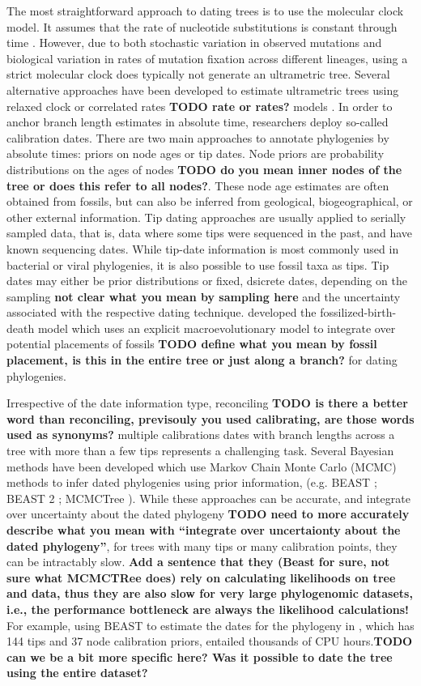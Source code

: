 \documentclass{llncs}
\begin{document}
The most straightforward approach to dating trees is to use the molecular clock model.
It assumes that the rate of nucleotide substitutions is constant through time \citep{zuckerkandl1962}.
However, due to both stochastic variation in observed mutations and 
biological variation in rates of mutation fixation across different lineages,
using a strict molecular clock does typically not generate an ultrametric tree.
Several alternative approaches have been developed to estimate
ultrametric trees using relaxed clock or correlated rates {\bf TODO rate or rates?} models \citep{Lepage2007, Thorne1998, Kishino2001}.
In order to anchor branch length estimates in absolute time, researchers deploy so-called calibration dates. 
There are two main approaches to annotate phylogenies by absolute times:
priors on node ages or tip dates.
Node priors are probability distributions on the ages of nodes {\bf TODO do you mean inner nodes of the tree or does this refer to all nodes?}.
These node age estimates are often obtained from fossils,
but can also be inferred from geological, biogeographical, or other external information.
Tip dating approaches are usually applied to serially sampled data, that is, 
data where some tips were sequenced in the past, and have known sequencing dates.
While tip-date information is most commonly used in bacterial or viral phylogenies,
it is also possible to use fossil taxa as tips.
Tip dates may either be prior distributions or fixed, dsicrete dates, 
depending on the sampling {\bf not clear what you mean by sampling here} and the uncertainty associated with the respective
dating technique.
\citet{Heath2014} developed the fossilized-birth-death model which 
uses an explicit macroevolutionary model to integrate over potential 
placements of fossils {\bf TODO define what you mean by fossil placement, is this in the entire tree or just along a branch?} for dating phylogenies.

Irrespective of the date information type, reconciling {\bf TODO is there a better word than reconciling, previsouly you used calibrating, are those words used as synonyms?} 
multiple calibrations dates with branch lengths across a tree with more than a few tips represents a challenging task.
Several Bayesian methods have been developed which use Markov Chain Monte Carlo (MCMC) methods
to infer dated phylogenies using prior information, 
(e.g. BEAST \citealt{Drummond2007}; BEAST 2 \citealt{bouckaert2014}; MCMCTree \citealt{Stadler2013}).
While these approaches can be accurate, and integrate over uncertainty about the dated
phylogeny {\bf TODO need to more accurately describe what you mean with ``integrate over uncertaionty about the dated phylogeny''}, 
for trees with many tips or many calibration points, they can be intractably slow.
{\bf Add a sentence that they (Beast for sure, not sure what MCMCTRee does) rely on calculating likelihoods on tree and data,
thus they are also slow for very large phylogenomic datasets, i.e., the performance bottleneck are always the likelihood calculations!}
For example, using BEAST to estimate the dates for the phylogeny in \citet{Misof2014}, which has 144 tips
and 37 node calibration priors, entailed thousands of CPU hours.{\bf TODO can we be a bit more specific here? Was it possible to date the tree using the entire dataset?}
\end{document}
